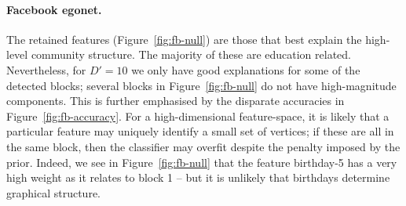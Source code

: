 \paragraph{\textbf{Facebook egonet.}}

The retained features 
(Figure~\ref{fig:fb-null}) are those that best explain the high-level 
community structure. The majority of these are education related. 
Nevertheless, for $D'=10$ we only have good explanations for some of the detected blocks; several blocks in 
Figure~\ref{fig:fb-null} do not have high-magnitude components. This is further emphasised by the disparate accuracies in Figure~\ref{fig:fb-accuracy}.
%
For a high-dimensional feature-space, it is likely that a particular
feature may uniquely identify a small set of vertices; if these are all in the same block, then the classifier may overfit despite the penalty imposed by the prior. Indeed, we see in
Figure~\ref{fig:fb-null} that the feature birthday-5 has a very high weight as it relates to block 1 – but it is unlikely that birthdays determine graphical structure.